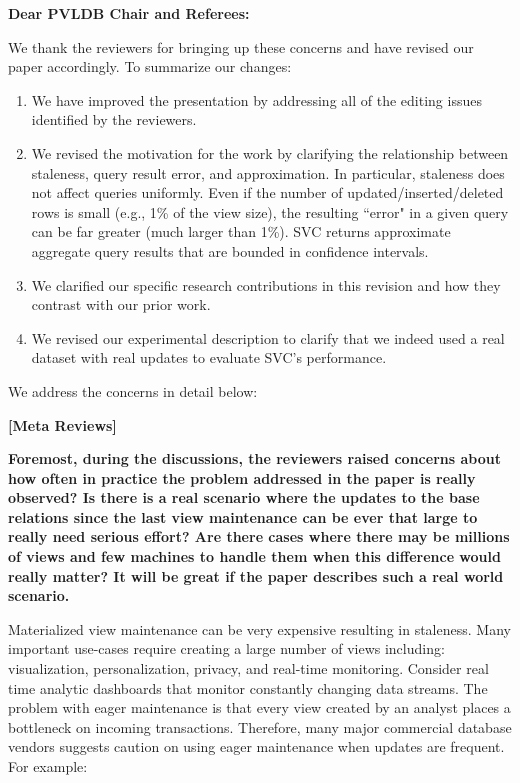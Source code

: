 {\noindent \normalsize \bf Dear PVLDB Chair and Referees: }

We thank the reviewers for bringing up these concerns and have revised our paper accordingly. To summarize our changes:
\begin{enumerate}[noitemsep]
\item We have improved the presentation by addressing all of the editing issues identified by the reviewers.
\item We revised the motivation for the work by clarifying the relationship between staleness, query result error, and approximation. In particular, staleness does not affect queries uniformly. Even if the number of updated/inserted/deleted rows is small (e.g., 1\% of the view size), the resulting ``error" in a given query can be far greater (much larger than 1\%). %
SVC returns approximate aggregate query results that are bounded in confidence intervals.
\item We clarified our specific research contributions in this revision and how they contrast with our prior work.
\item We revised our experimental description to clarify that we indeed used a real dataset with real updates to evaluate SVC's performance. 
\end{enumerate}

\vspace{1.5em}
We address the concerns in detail below: 

\noindent \textbf{[Meta Reviews]}

\vspace{0.5em}

\textbf{Foremost, during the discussions, the reviewers raised concerns about how often in practice the problem addressed in the paper is really observed? Is there is a real scenario where the updates to the base relations since the last view maintenance can be ever that large to really need serious effort? Are there cases where there may be millions of views and few machines to handle them when this difference would really matter? It will be great if the paper describes such a real world scenario.}

Materialized view maintenance can be very expensive resulting in staleness. Many important use-cases require creating a large number of views including: visualization, personalization, privacy, and real-time monitoring. 
 Consider real time analytic dashboards that monitor constantly changing data streams.  
The problem with eager maintenance is that every view created by an analyst places a bottleneck on incoming transactions.  Therefore, many major commercial database vendors suggests caution on using eager maintenance when updates are frequent. For example:

